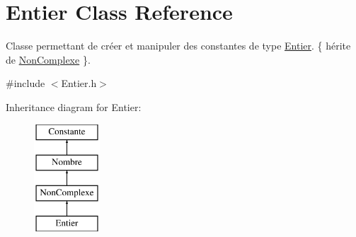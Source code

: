 \hypertarget{classEntier}{\section{\-Entier \-Class \-Reference}
\label{classEntier}
}


\-Classe permettant de créer et manipuler des constantes de type \hyperlink{classEntier}{\-Entier}. \{ hérite de \hyperlink{classNonComplexe}{\-Non\-Complexe} \}.  




{\ttfamily \#include $<$\-Entier.\-h$>$}

\-Inheritance diagram for \-Entier\-:\begin{figure}[H]
\begin{center}
\leavevmode
\includegraphics[height=4.000000cm]{classEntier}
\end{center}
\end{figure}
